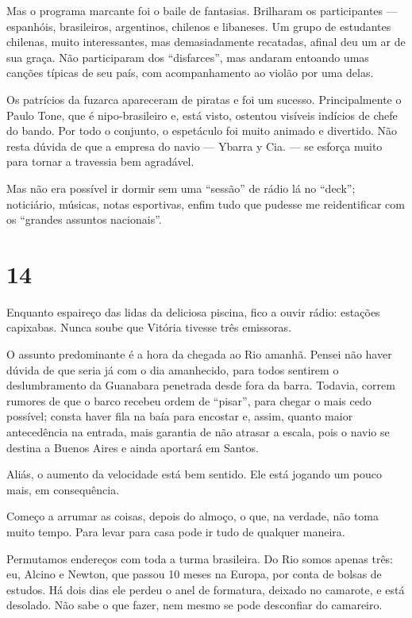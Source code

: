 Mas o programa marcante foi o baile de fantasias. Brilharam os participantes --- espanhóis, brasileiros, argentinos, chilenos e libaneses. Um grupo de estudantes chilenas, muito interessantes, mas demasiadamente recatadas, afinal deu um ar de sua graça. Não participaram dos ``disfarces'', mas andaram entoando umas canções típicas de seu país, com acompanhamento ao violão por uma delas.

Os patrícios da fuzarca apareceram de piratas e foi um sucesso. Principalmente o Paulo Tone, que é nipo-brasileiro e, está visto, ostentou visíveis indícios de chefe do bando. Por todo o conjunto, o espetáculo foi muito animado e divertido. Não resta dúvida de que a empresa do navio --- Ybarra y Cia. --- se esforça muito para tornar a travessia bem agradável.

Mas não era possível ir dormir sem uma ``sessão'' de rádio lá no ``deck''; noticiário, músicas, notas esportivas, enfim tudo que pudesse me reidentificar com os ``grandes assuntos nacionais''.

\section*{14 \adfflatleafright {}}
Enquanto espaireço das lidas da deliciosa piscina, fico a ouvir rádio: estações capixabas. Nunca soube que Vitória tivesse três emissoras.

O assunto predominante é a hora da chegada ao Rio amanhã. Pensei não haver dúvida de que seria já com o dia amanhecido, para todos sentirem o deslumbramento da Guanabara penetrada desde fora da barra. Todavia, correm rumores de que o barco recebeu ordem de ``pisar'', para chegar o mais cedo possível; consta haver fila na baía para encostar e, assim, quanto maior antecedência na entrada, mais garantia de não atrasar a escala, pois o navio se destina a Buenos Aires e ainda aportará em Santos.

Aliás, o aumento da velocidade está bem sentido. Ele está jogando um pouco mais, em consequência.

Começo a arrumar as coisas, depois do almoço, o que, na verdade, não toma muito tempo. Para levar para casa pode ir tudo de qualquer maneira.

Permutamos endereços com toda a turma brasileira. Do Rio somos apenas três: eu, Alcino e Newton, que passou 10 meses na Europa, por conta de bolsas de estudos. Há dois dias ele perdeu o anel de formatura, deixado no camarote, e está desolado. Não sabe o que fazer, nem mesmo se pode desconfiar do camareiro.

